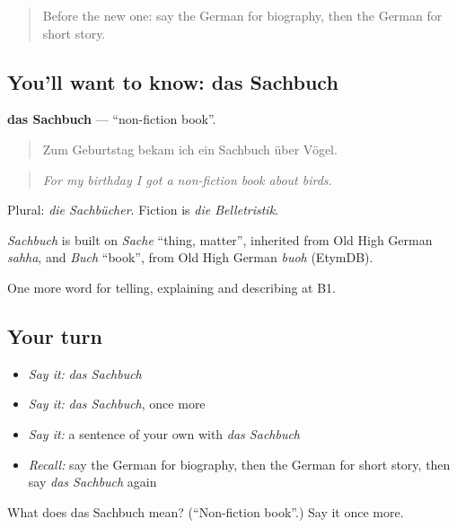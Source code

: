 \begin{quote}
Before the new one: say the German for biography, then the German for short story.
\end{quote}

\subsection*{You'll want to know: das Sachbuch}
\textbf{das Sachbuch} — \textquotedblleft{}non-fiction book\textquotedblright{}.

\begin{quote}
Zum Geburtstag bekam ich ein Sachbuch über Vögel.
\end{quote}

\begin{quote}
\emph{For my birthday I got a non-fiction book about birds.}
\end{quote}

Plural: \emph{die Sachbücher}. Fiction is \emph{die Belletristik}.

\begin{cousinweb}
\emph{Sachbuch} is built on \emph{Sache} \textquotedblleft{}thing, matter\textquotedblright{}, inherited from Old High German \emph{sahha}, and \emph{Buch} \textquotedblleft{}book\textquotedblright{}, from Old High German \emph{buoh} (EtymDB).
\end{cousinweb}

\begin{grammarlens}[title={What you've built}]
One more word for telling, explaining and describing at B1.
\end{grammarlens}

\subsection*{Your turn}
\begin{itemize}
\raggedright
  \item \emph{Say it:} \emph{das Sachbuch}
  \item \emph{Say it:} \emph{das Sachbuch}, once more
  \item \emph{Say it:} a sentence of your own with \emph{das Sachbuch}
  \item \emph{Recall:} say the German for biography, then the German for short story, then say \emph{das Sachbuch} again
\end{itemize}

\begin{tcolorbox}[breakable,colback=teal!4,colframe=teal!35!black,title={Before you move on}]
What does das Sachbuch mean? (\textquotedblleft{}Non-fiction book\textquotedblright{}.) Say it once more.
\end{tcolorbox}
